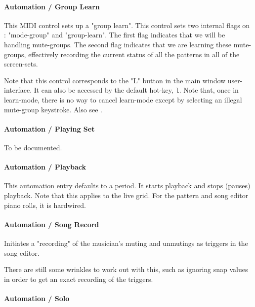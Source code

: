 \paragraph{Automation / Group Learn}
\label{paragraph:configuration_midi_ctrl_modglean}

   This MIDI control sets up a "group learn".
   This control sets two internal flags on : "mode-group" and "group-learn".
   The first flag indicates that we will be handling mute-groups.
   The second flag indicates that we are learning these mute-groups,
   effectively recording the current status of all the patterns in all of the
   screen-sets.

   Note that this control corresponds to the "L" button in the main window
   user-interface.
   It can also be accessed by the default hot-key, \texttt{l}.
   Note that, once in learn-mode, there is no way to cancel learn-mode
   except by selecting an illegal mute-group keystroke.
   Also see .

\paragraph{Automation / Playing Set}
\label{paragraph:configuration_playing_set}

   To be documented.

\paragraph{Automation / Playback}
\label{paragraph:configuration_playback}

   This automation entry defaults to a period.
   It starts playback and stops (pauses) playback.
   Note that this applies to the live grid.
   For the pattern and song editor piano rolls, it is hardwired.

\paragraph{Automation / Song Record}
\label{paragraph:configuration_song_record}

   Initiates a "recording" of the musician's muting and unmutings as triggers
   in the song editor.

   There are still some wrinkles to work out with this, such as ignoring snap
   values in order to get an exact recording of the triggers.

\paragraph{Automation / Solo}
\label{paragraph:configuration_midi_ctrl_solo}

